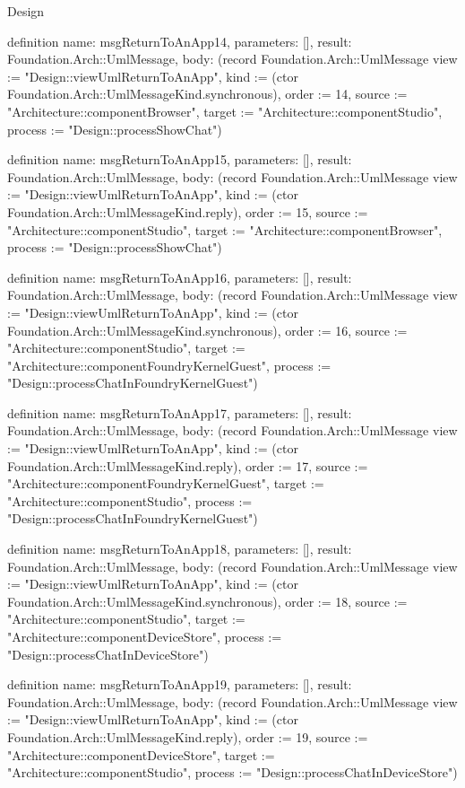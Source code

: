 \begin{lexlean}{Design}
\begin{semanticmodule}
definition{
  name: msgReturnToAnApp14,
  parameters: [],
  result: Foundation.Arch::UmlMessage,
  body: (record Foundation.Arch::UmlMessage {view := "Design::viewUmlReturnToAnApp", kind := (ctor Foundation.Arch::UmlMessageKind.synchronous), order := 14, source := "Architecture::componentBrowser", target := "Architecture::componentStudio", process := "Design::processShowChat"})
}

definition{
  name: msgReturnToAnApp15,
  parameters: [],
  result: Foundation.Arch::UmlMessage,
  body: (record Foundation.Arch::UmlMessage {view := "Design::viewUmlReturnToAnApp", kind := (ctor Foundation.Arch::UmlMessageKind.reply), order := 15, source := "Architecture::componentStudio", target := "Architecture::componentBrowser", process := "Design::processShowChat"})
}

definition{
  name: msgReturnToAnApp16,
  parameters: [],
  result: Foundation.Arch::UmlMessage,
  body: (record Foundation.Arch::UmlMessage {view := "Design::viewUmlReturnToAnApp", kind := (ctor Foundation.Arch::UmlMessageKind.synchronous), order := 16, source := "Architecture::componentStudio", target := "Architecture::componentFoundryKernelGuest", process := "Design::processChatInFoundryKernelGuest"})
}

definition{
  name: msgReturnToAnApp17,
  parameters: [],
  result: Foundation.Arch::UmlMessage,
  body: (record Foundation.Arch::UmlMessage {view := "Design::viewUmlReturnToAnApp", kind := (ctor Foundation.Arch::UmlMessageKind.reply), order := 17, source := "Architecture::componentFoundryKernelGuest", target := "Architecture::componentStudio", process := "Design::processChatInFoundryKernelGuest"})
}

definition{
  name: msgReturnToAnApp18,
  parameters: [],
  result: Foundation.Arch::UmlMessage,
  body: (record Foundation.Arch::UmlMessage {view := "Design::viewUmlReturnToAnApp", kind := (ctor Foundation.Arch::UmlMessageKind.synchronous), order := 18, source := "Architecture::componentStudio", target := "Architecture::componentDeviceStore", process := "Design::processChatInDeviceStore"})
}

definition{
  name: msgReturnToAnApp19,
  parameters: [],
  result: Foundation.Arch::UmlMessage,
  body: (record Foundation.Arch::UmlMessage {view := "Design::viewUmlReturnToAnApp", kind := (ctor Foundation.Arch::UmlMessageKind.reply), order := 19, source := "Architecture::componentDeviceStore", target := "Architecture::componentStudio", process := "Design::processChatInDeviceStore"})
}


\end{semanticmodule}
\end{lexlean}
